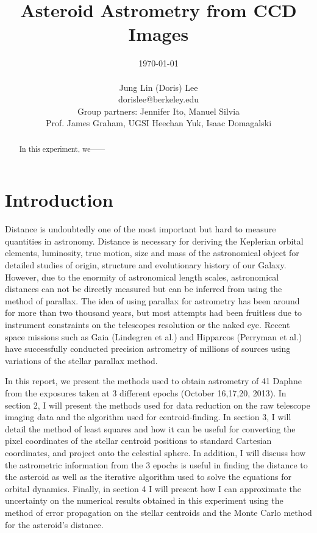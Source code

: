 \documentclass[authoryear, 12pt,5p, times]{elsarticle}
\begin{document}
\begin{frontmatter}
\title{Asteroid Astrometry from CCD Images}
\author{\today \\ \quad \\Jung Lin (Doris) Lee\\ dorislee@berkeley.edu\\Group partners: Jennifer Ito, Manuel Silvia\\Prof. James Graham, UGSI Heechan Yuk, Isaac Domagalski}
	\begin{abstract}
In this experiment,  we------
	\end{abstract}
\end{frontmatter}
\section{Introduction}
Distance is undoubtedly one of the most important but hard to measure quantities in astronomy. Distance is necessary for deriving the Keplerian orbital elements, luminosity, true motion, size and mass of the astronomical object for detailed studies of origin, structure and evolutionary history of our Galaxy. However, due to the enormity of astronomical length scales, astronomical distances can not be directly measured but can be inferred from using the method of parallax. The idea of using parallax for astrometry has been around for more than two thousand years, but most attempts had been fruitless due to instrument constraints on the telescopes resolution or the naked eye. Recent space missions such as Gaia (Lindegren et al.) and  Hipparcos (Perryman et al.) have successfully conducted precision astrometry of millions of sources using variations of the stellar parallax method.

In this report, we present the methods used to obtain astrometry of 41 Daphne from the exposures taken at 3 different epochs (October 16,17,20, 2013). In section 2, I will present the methods used for data reduction on the raw telescope imaging data and the algorithm used for centroid-finding. In section 3, I will detail the method of least squares and how it can be useful for converting the pixel coordinates of the stellar centroid positions to standard Cartesian coordinates, and project onto the celestial sphere. In addition, I will discuss how the astrometric information from the 3 epochs is useful in finding the distance to the asteroid as well as the iterative algorithm used to solve the equations for orbital dynamics. Finally, in section 4 I will present how I can approximate the uncertainty on the  numerical results obtained in this experiment using the method of error propagation on the stellar centroids and the Monte Carlo method for the asteroid's distance.
\end{document}
